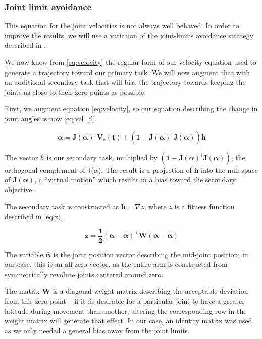 \documentclass[10pt, conference]{IEEEtran}
\begin{document}
\subsubsection{Joint limit avoidance}
\label{sec-3-4-4}

    This equation for the joint velocities is not always well
    behaved. In order to improve the results, we will use a variation
    of the joint-limits avoidance strategy described in
    \cite{luc_baron}.

    We now know from \ref{eq:velocity} the regular form of our
    velocity equation used to generate a trajectory toward our primary
    task. We will now augment that with an additional secondary task
    that will bias the trajectory towards keeping the joints as close
    to their zero points as possible.

    First, we augment equation \ref{eq:velocity}, so our equation
    describing the change in joint angles is now \ref{eq:vel_jl}.

    \begin{equation}
    \label{eq:vel_jl}
    \mathbf{\dot{\alpha} = J(\alpha)^{\dagger}V_e(t) + (1 -
    J(\alpha)^{\dagger}J(\alpha))h}
    \end{equation}

    The vector \(h\) is our secondary task, multiplied by \(\mathbf{
    (1 - J(\alpha)^{\dagger}J(\alpha))}\), the orthogonal complement
    of J($\alpha$). The result is a projection of \(\mathbf{h}\) into
    the null space of \(\mathbf{J(\alpha)}\), a ``virtual motion'' which
    results in a bias toward the secondary objective.

    The secondary task is constructed as  \(\mathbf{h} = \nabla z\),
    where \(z\) is a fitness function described in \ref{eq:z}.

    \begin{equation}
    \label{eq:z}
    \mathbf{ z = \frac{1}{2}(\alpha - \bar{\alpha})^{\top}W(\alpha -
    \bar{\alpha})}
    \end{equation}

    The variable \(\mathbf{\bar{\alpha}}\) is the joint position vector
    describing the mid-joint position; in our case, this is an all-zero
    vector, as the entire arm is constructed from symmetrically
    revolute joints centered around zero.

    The matrix \( \mathbf{W} \) is a diagonal weight matrix describing
    the acceptable deviation from this zero point -- if it ;is desirable
    for a particular joint to have a greater latitude during movement
    than another, altering the corresponding row in the weight matrix
    will generate that effect. In our case, an identity matrix was
    used, as we only needed a general bias away from the joint limits.
\end{document}
